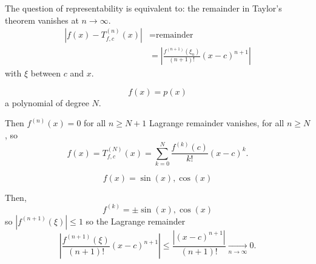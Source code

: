 \documentclass[10pt, a4paper]{article}
\begin{document}
The question of representability is equivalent to:
the remainder in Taylor's theorem vanishes at $n \rightarrow \infty$.
\begin{align*}
    |f(x) - T_{f, c}^{(n)}(x)| &= \text{remainder} \\
    &= \left|\frac{f ^ {(n + 1)}(\xi_n)}{(n + 1)!}(x - c) ^ {n + 1}\right|
\end{align*}
with $\xi$ between $c$ and $x$.

\begin{example}
    \[
    f(x) = p(x)
    \]
    a polynomial of degree $N$.

    \begin{solution}
        Then $f ^ {(n)}(x) = 0$ for all $n \geq N + 1$ Lagrange remainder vanishes,
        for all $n \geq N$,
        so
        \[
        f(x) = T_{f, c}^{(N)}(x) = \sum_{k = 0}^{N}\frac{f ^ {(k)}(c)}{k!}(x - c) ^ k.
        \]
    \end{solution}
\end{example}

\begin{example}
    \[
    f(x) = \sin(x), \cos(x)
    \]

    \begin{solution}
        Then,
        \[
        f ^ {(k)} = \pm\sin(x), \cos(x)
        \]
        so $|f ^ {(n + 1)}(\xi)| \leq 1$ so the Lagrange remainder
        \[
        \left|\frac{f ^ {(n + 1)}(\xi)}{(n + 1)!}(x - c) ^ {n + 1}\right| \leq \frac{\left|(x - c) ^ {n + 1}\right|}{(n + 1)!} \xrightarrow[n \rightarrow \infty]{} 0.
        \]
    \end{solution}
\end{example}
\end{document}
